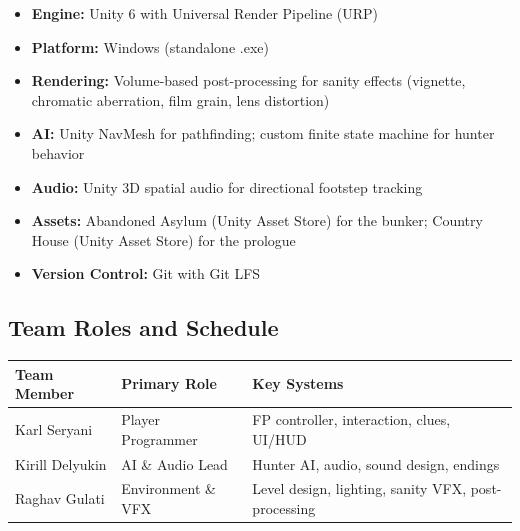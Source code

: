 \documentclass[12pt, letterpaper]{article}
\begin{document}
\begin{itemize}[leftmargin=2em, topsep=0pt, itemsep=2pt]
    \item \textbf{Engine:} Unity 6 with Universal Render Pipeline (URP)
    \item \textbf{Platform:} Windows (standalone .exe)
    \item \textbf{Rendering:} Volume-based post-processing for sanity effects (vignette, chromatic aberration, film grain, lens distortion)
    \item \textbf{AI:} Unity NavMesh for pathfinding; custom finite state machine for hunter behavior
    \item \textbf{Audio:} Unity 3D spatial audio for directional footstep tracking
    \item \textbf{Assets:} Abandoned Asylum (Unity Asset Store) for the bunker; Country House (Unity Asset Store) for the prologue
    \item \textbf{Version Control:} Git with Git LFS
\end{itemize}

\subsection{Team Roles and Schedule}

\begin{table}[h]
\centering
\small
\begin{tabular}{@{}p{3.5cm}p{4cm}p{5cm}@{}}
\toprule
\textbf{Team Member} & \textbf{Primary Role} & \textbf{Key Systems} \\
\midrule
Karl Seryani & Player Programmer & FP controller, interaction, clues, UI/HUD \\
\addlinespace
Kirill Delyukin & AI \& Audio Lead & Hunter AI, audio, sound design, endings \\
\addlinespace
Raghav Gulati & Environment \& VFX & Level design, lighting, sanity VFX, post-processing \\
\bottomrule
\end{tabular}
\end{table}
\end{document}
